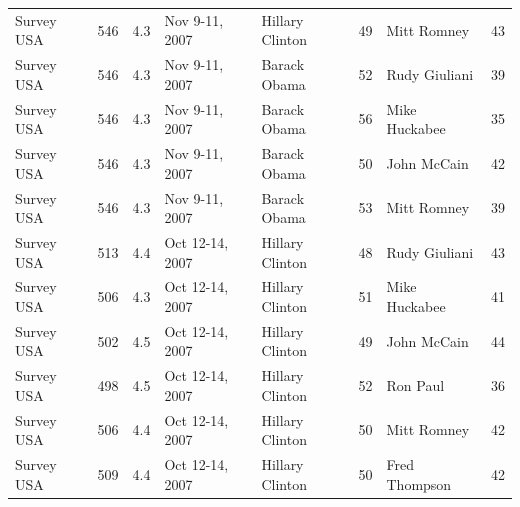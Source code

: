 \documentclass{article}
\begin{document}
\begin{tabular}{llllllll}
Survey USA & 546 & 4.3 & Nov 9-11, 2007 & Hillary Clinton & 49 & Mitt Romney & 43 \\
Survey USA & 546 & 4.3 & Nov 9-11, 2007 & Barack Obama & 52 & Rudy Giuliani & 39 \\
Survey USA & 546 & 4.3 & Nov 9-11, 2007 & Barack Obama & 56 & Mike Huckabee & 35 \\
Survey USA & 546 & 4.3 & Nov 9-11, 2007 & Barack Obama & 50 & John McCain & 42 \\
Survey USA & 546 & 4.3 & Nov 9-11, 2007 & Barack Obama & 53 & Mitt Romney & 39 \\
Survey USA & 513 & 4.4 & Oct 12-14, 2007 & Hillary Clinton & 48 & Rudy Giuliani & 43 \\
Survey USA & 506 & 4.3 & Oct 12-14, 2007 & Hillary Clinton & 51 & Mike Huckabee & 41 \\
Survey USA & 502 & 4.5 & Oct 12-14, 2007 & Hillary Clinton & 49 & John McCain & 44 \\
Survey USA & 498 & 4.5 & Oct 12-14, 2007 & Hillary Clinton & 52 & Ron Paul & 36 \\
Survey USA & 506 & 4.4 & Oct 12-14, 2007 & Hillary Clinton & 50 & Mitt Romney & 42 \\
Survey USA & 509 & 4.4 & Oct 12-14, 2007 & Hillary Clinton & 50 & Fred Thompson & 42 \\
\bottomrule
\end{tabular}
\end{document}
